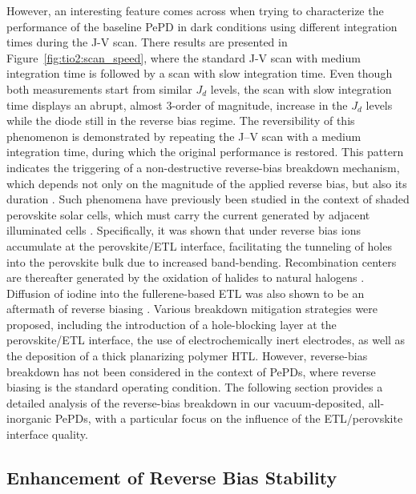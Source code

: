 However, an interesting feature comes across when trying to characterize the performance of the baseline PePD in dark conditions using different integration times during the J-V scan. There results are presented in Figure~\ref{fig:tio2:scan_speed}, where the standard J-V scan with medium integration time is followed by a scan with slow integration time. Even though both measurements start from similar $J_d$ levels, the scan with slow integration time displays an abrupt, almost 3-order of magnitude, increase in the $J_d$ levels while the diode still in the reverse bias regime. The reversibility of this phenomenon is demonstrated by repeating the J–V scan with a medium integration time, during which the original performance is restored. This pattern indicates the triggering of a non-destructive reverse-bias breakdown mechanism, which depends not only on the magnitude of the applied reverse bias, but also its duration \cite{Bertoluzzi2021IncorporatingBias}. Such phenomena have previously been studied in the context of shaded perovskite solar cells, which must carry the current generated by adjacent illuminated cells \cite{Jiang2024ImprovedElectrodes, Ren2024MobileCells, Li2024BarrierBias,Gould2021In-OperandoBias,Razera2020InstabilityBias,Bertoluzzi2021IncorporatingBias,Wang2023PerovskiteDegradation,Bowring2018ReverseCells, Ni2021EvolutionIllumination}. Specifically, it was shown that under reverse bias ions accumulate at the perovskite/ETL interface, facilitating the tunneling of holes into the perovskite bulk due to increased band-bending. Recombination centers are thereafter generated by the oxidation of halides to natural halogens \cite{Bertoluzzi2021IncorporatingBias}. Diffusion of iodine into the fullerene-based ETL was also shown to be an aftermath of reverse biasing \cite{Razera2020InstabilityBias}. Various breakdown mitigation strategies were proposed, including the introduction of a hole-blocking layer at the perovskite/ETL interface, the use of electrochemically inert electrodes, as well as the deposition of a thick planarizing polymer HTL. However, reverse-bias breakdown has not been considered in the context of PePDs, where reverse biasing is the standard operating condition. The following section provides a detailed analysis of the reverse-bias breakdown in our vacuum-deposited, all-inorganic PePDs, with a particular focus on the influence of the ETL/perovskite interface quality.


\subsection{Enhancement of Reverse Bias Stability}

